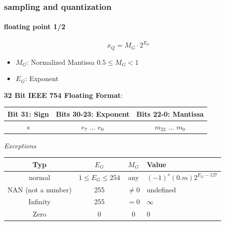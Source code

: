 	\begin{frame}\frametitle{sampling and quantization}\framesubtitle{floating point 1/2}
		\begin{equation}
		x_Q = M_G \cdot 2^{E_G}
		\end{equation}
		
		\begin{itemize}
			\item	$M_G$: Normalized Mantissa $ 0.5 \leq M_{G} < 1$
			\item	$E_G$: Exponent
		\end{itemize}
		
		\pause
		\textbf{32 Bit IEEE 754 Floating Format}:
		\begin{table}
			\centering
			\begin{footnotesize}
				\begin{tabular}{ccc}
				\hline
				\textbf{Bit 31: Sign} & \textbf{Bits 30-23: Exponent} & \textbf{Bits 22-0: Mantissa}\\
				\hline
				$s$ & $e_{7}$ ... $e_{0}$ & $m_{22}$ ... $m_{0}$\\
				\hline
				\end{tabular}
			\end{footnotesize}
		\end{table}
		\pause
		\textit{Exceptions}
		\vspace{-3mm}
		\begin{table}
			\centering
			\begin{footnotesize}
					\begin{tabular}{cccl}
					\hline
					\textbf{Typ} & \textbf{$E_G$} & \textbf{$M_{G}$} & \textbf{Value}\\
					\hline 
					normal & $1\leq E_G \leq 254$ & any & $(-1)^s (0.m)2^{E_G-127}$\\
					\hline
					NAN (not a number)& 255 & $\neq 0$ & undefined\\
					\hline
					Infinity & 255 & $=0$ & $\infty$\\
					\hline
					Zero & 0 & 0 & 0\\
					\hline
					\end{tabular}
			\end{footnotesize}
		\end{table}
	\end{frame}	
	
